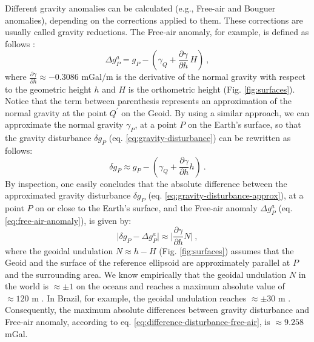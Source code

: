 \documentclass[extra]{gji}
\begin{document}
Different gravity anomalies can be calculated (e.g., Free-air and
Bouguer anomalies), depending on the corrections applied to
them. These corrections are usually called gravity reductions.
The Free-air anomaly, for example, is defined as follows
\citep{blakely1996, hofmann-wellenhof-moritz2005}:
\begin{equation}
\Delta g_{P}^{a}
= g_{P} - \left( \gamma_{Q} + \frac{\partial \gamma}{\partial h} \, H \right)
\: ,
\label{eq:free-air-anomaly}
\end{equation}
where $\frac{\partial \gamma}{\partial h} \approx -0.3086$ mGal/m is the
derivative of the normal gravity with respect to the geometric height $h$
and $H$ is the orthometric height (Fig. \ref{fig:surfaces}).
Notice that the term between parenthesis represents an
approximation of the normal gravity at the point $Q^{\prime}$ on the
Geoid. By using a similar approach, we can approximate the normal gravity
$\gamma_{P}$, at a point $P$ on the Earth's surface, so that the
gravity disturbance $\delta g_{P}$ (eq. \ref{eq:gravity-disturbance})
can be rewritten as follows:
\begin{equation}
\delta g_{P} \approx g_{P} -
\left( \gamma_{Q} + \frac{\partial \gamma}{\partial h} h \right) \: .
\label{eq:gravity-disturbance-approx}
\end{equation}
By inspection, one easily concludes that the absolute difference
between the approximated gravity disturbance $\delta g_{P}$
(eq. \ref{eq:gravity-disturbance-approx}), at a point $P$ on or close to
the Earth's surface, and the Free-air anomaly
$\Delta g_{P}^{a}$ (eq. \ref{eq:free-air-anomaly}), is given by:
\begin{equation}
\vert \delta g_{P} - \Delta g^{a}_{P} \vert \approx
\vert \frac{\partial \gamma}{\partial h} N \vert \: ,
\label{eq:difference-disturbance-free-air}
\end{equation}
where the geoidal undulation $N \approx h - H$ (Fig. \ref{fig:surfaces}) assumes
that the Geoid and the surface of the reference ellipsoid
are approximately parallel at $P$ and the surrounding area.
We know empirically that the geoidal undulation $N$ in the world
is $\approx \pm 1$ on the oceans and reaches a
maximum absolute value of $\approx 120$ m \citep[e.g.,][]{torge2012,
sanso_sideris2013}. In Brazil, for example, the geoidal undulation
reaches $\approx \pm 30$ m \citep{ibge_mapgeo2015}. Consequently, the
maximum absolute differences between gravity disturbance and
Free-air anomaly, according to eq. \ref{eq:difference-disturbance-free-air},
is $\approx 9.258$ mGal.
\end{document}
